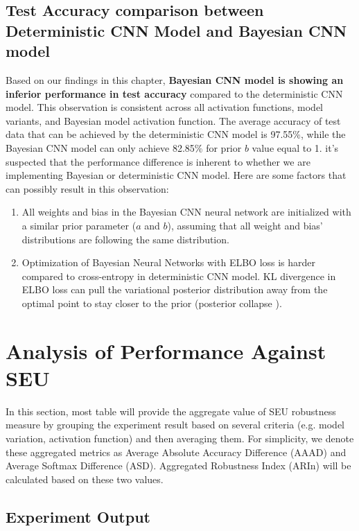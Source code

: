 \documentclass[ %
                    author={Revalda Putawara},
                supervisor={Dr. James Pope},
                    degree={MSc},
                     title={Robustness of Bayesian Neural Networks Design Choices Against Weight and Bias Perturbation Induced by Single Event Upsets (SEUs)},
                      type={},
                      year={2025}]{dissertation}
\begin{document}
\subsection{Test Accuracy comparison between Deterministic CNN Model and Bayesian CNN model}

Based on our findings in this chapter, \textbf{Bayesian CNN model is showing an inferior performance in test accuracy} compared to the deterministic CNN model. This observation is consistent across all activation functions, model variants, and Bayesian model activation function. The average accuracy of test data that can be achieved by the deterministic CNN model is 97.55\%, while the Bayesian CNN model can only achieve 82.85\% for prior $b$ value equal to 1. it's suspected that the performance difference is inherent to whether we are implementing Bayesian or deterministic CNN model. Here are some factors that can possibly result in this observation:
\begin{enumerate}[noitemsep, topsep=0pt]
\item All weights and bias in the Bayesian CNN neural network are initialized with a similar prior parameter ($a$ and $b$), assuming that all weight and bias' distributions are following the same distribution. 
\item Optimization of Bayesian Neural Networks with ELBO loss is harder compared to cross-entropy in deterministic CNN model. KL divergence in ELBO loss can pull the variational posterior distribution away from the optimal point to stay closer to the prior (posterior collapse \cite{posteriorcollapsevae2019}).
\end{enumerate}

\section{Analysis of Performance Against SEU} \label{section:SEUperformance}

In this section, most table will provide the aggregate value of SEU robustness measure by grouping the experiment result based on several criteria (e.g. model variation, activation function) and then averaging them. For simplicity, we denote these aggregated metrics as Average Absolute Accuracy Difference (AAAD) and Average Softmax Difference (ASD). Aggregated Robustness Index (ARIn) will be calculated based on these two values.

\subsection{Experiment Output} \label{subsection:experimentoutput}
\end{document}
